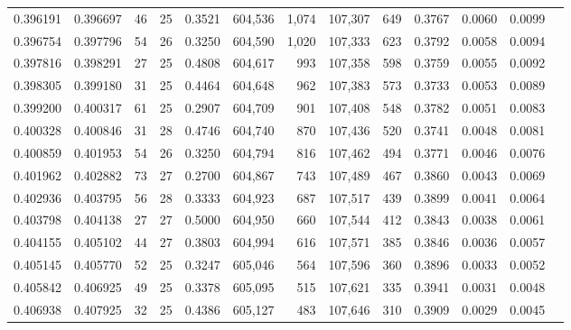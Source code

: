 \begin{tabular}{rrrrrrrrrrrrr}
0.396191 & 0.396697 &  46 &  25 &                                     0.3521 & 604,536 &   1,074 & 107,307 &     649 & 0.3767 & 0.0060 & 0.0099 \\
0.396754 & 0.397796 &  54 &  26 &                                     0.3250 & 604,590 &   1,020 & 107,333 &     623 & 0.3792 & 0.0058 & 0.0094 \\
0.397816 & 0.398291 &  27 &  25 &                                     0.4808 & 604,617 &     993 & 107,358 &     598 & 0.3759 & 0.0055 & 0.0092 \\
0.398305 & 0.399180 &  31 &  25 &                                     0.4464 & 604,648 &     962 & 107,383 &     573 & 0.3733 & 0.0053 & 0.0089 \\
0.399200 & 0.400317 &  61 &  25 &                                     0.2907 & 604,709 &     901 & 107,408 &     548 & 0.3782 & 0.0051 & 0.0083 \\
0.400328 & 0.400846 &  31 &  28 &                                     0.4746 & 604,740 &     870 & 107,436 &     520 & 0.3741 & 0.0048 & 0.0081 \\
0.400859 & 0.401953 &  54 &  26 &                                     0.3250 & 604,794 &     816 & 107,462 &     494 & 0.3771 & 0.0046 & 0.0076 \\
0.401962 & 0.402882 &  73 &  27 &                                     0.2700 & 604,867 &     743 & 107,489 &     467 & 0.3860 & 0.0043 & 0.0069 \\
0.402936 & 0.403795 &  56 &  28 &                                     0.3333 & 604,923 &     687 & 107,517 &     439 & 0.3899 & 0.0041 & 0.0064 \\
0.403798 & 0.404138 &  27 &  27 &                                     0.5000 & 604,950 &     660 & 107,544 &     412 & 0.3843 & 0.0038 & 0.0061 \\
0.404155 & 0.405102 &  44 &  27 &                                     0.3803 & 604,994 &     616 & 107,571 &     385 & 0.3846 & 0.0036 & 0.0057 \\
0.405145 & 0.405770 &  52 &  25 &                                     0.3247 & 605,046 &     564 & 107,596 &     360 & 0.3896 & 0.0033 & 0.0052 \\
0.405842 & 0.406925 &  49 &  25 &                                     0.3378 & 605,095 &     515 & 107,621 &     335 & 0.3941 & 0.0031 & 0.0048 \\
0.406938 & 0.407925 &  32 &  25 &                                     0.4386 & 605,127 &     483 & 107,646 &     310 & 0.3909 & 0.0029 & 0.0045 \\

\end{tabular}
